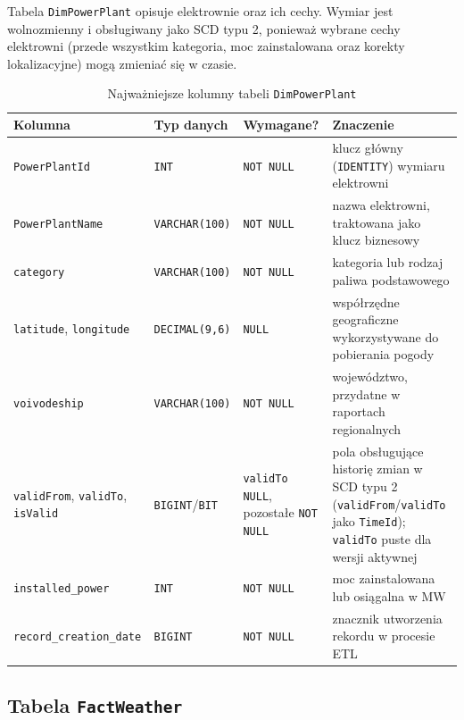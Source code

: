 \documentclass[12pt]{article}
\begin{document}
	Tabela \texttt{DimPowerPlant} opisuje elektrownie oraz ich cechy. Wymiar jest wolnozmienny i obsługiwany jako SCD typu 2, ponieważ wybrane cechy elektrowni (przede wszystkim kategoria, moc zainstalowana oraz korekty lokalizacyjne) mogą zmieniać się w czasie.

	\begin{table}[h!]
		\centering
		\small
		\begin{tabularx}{\textwidth}{|p{3.7cm}|p{2.2cm}|p{2.5cm}|X|}
			\hline
			\textbf{Kolumna} & \textbf{Typ danych} & \textbf{Wymagane?} & \textbf{Znaczenie} \\
			\hline
			\texttt{PowerPlantId} & \texttt{INT} & \texttt{NOT NULL} & klucz główny (\texttt{IDENTITY}) wymiaru elektrowni \\
			\hline
			\texttt{PowerPlantName} & \texttt{VARCHAR(100)} & \texttt{NOT NULL} & nazwa elektrowni, traktowana jako klucz biznesowy \\
			\hline
			\texttt{category} & \texttt{VARCHAR(100)} & \texttt{NOT NULL} & kategoria lub rodzaj paliwa podstawowego \\
			\hline
			\texttt{latitude}, \texttt{longitude} & \texttt{DECIMAL(9,6)} & \texttt{NULL} & współrzędne geograficzne wykorzystywane do pobierania pogody \\
			\hline
			\texttt{voivodeship} & \texttt{VARCHAR(100)} & \texttt{NOT NULL} & województwo, przydatne w raportach regionalnych \\
			\hline
			\texttt{validFrom}, \texttt{validTo}, \texttt{isValid} & \texttt{BIGINT}/\texttt{BIT} & \texttt{validTo} \texttt{NULL}, pozostałe \texttt{NOT NULL} & pola obsługujące historię zmian w SCD typu 2 (\texttt{validFrom}/\texttt{validTo} jako \texttt{TimeId}); \texttt{validTo} puste dla wersji aktywnej \\
			\hline
			\texttt{installed\_power} & \texttt{INT} & \texttt{NOT NULL} & moc zainstalowana lub osiągalna w MW \\
			\hline
			\texttt{record\_creation\_date} & \texttt{BIGINT} & \texttt{NOT NULL} & znacznik utworzenia rekordu w procesie ETL \\
			\hline
		\end{tabularx}
		\caption{Najważniejsze kolumny tabeli \texttt{DimPowerPlant}}
	\end{table}

	\subsection{Tabela \texttt{FactWeather}}
\end{document}
